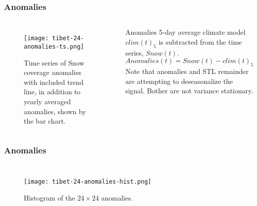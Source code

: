 \begin{frame}
\frametitle{Anomalies}
\begin{columns}
\begin{figure}[ht]
\centering
\begin{minipage}{1\columnwidth}
\texttt{[image: tibet-24-anomalies-ts.png]}
\caption{Time series of Snow coverage anomalies with included trend line, in addition to yearly averaged anomalies, shown by the bar chart.}
\end{minipage}
\end{figure}
\begin{block}{Anomalies}
5-day average climate model $clim(t)_{5}$ is subtracted from the time series, $Snow(t)$.
\begin{equation*}
Anomalies(t) = Snow(t)-clim(t)_{5}
\end{equation*}
Note that anomalies and STL remainder are attempting to deseasonalize the signal. Bother are not variance stationary.
\end{block}
\end{columns}
\end{frame}

\begin{frame}
\frametitle{Anomalies}
\begin{columns}
\begin{table}
\centering
\caption{Anomaly Distribution Properties}
\hspace*{.5cm}
\end{table}
\begin{figure}
\hspace*{1cm}
\centering
\begin{minipage}{1\columnwidth}
\texttt{[image: tibet-24-anomalies-hist.png]}
\caption{Histogram of the $24 \times 24$ anomalies.}
\end{minipage}
\end{figure}
\end{columns}
\end{frame}

